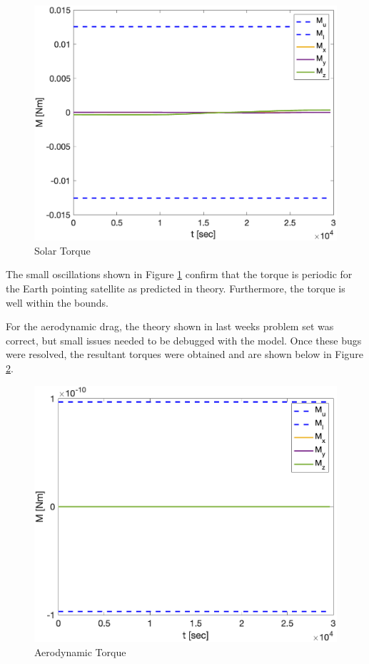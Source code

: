 \begin{figure}[H]
    \centering
    \captionsetup{ justification = centering }
    \includegraphics[width = 12cm]{Images/PS6/solar_torque.png}
    \caption{Solar Torque}
    \label{fig:solar_torque}
\end{figure}

The small oscillations shown in Figure \ref{fig:solar_torque} confirm that the torque is periodic for the Earth pointing satellite as predicted in theory. Furthermore, the torque is well within the bounds. 

For the aerodynamic drag, the theory shown in last weeks problem set was correct, but small issues needed to be debugged with the model. Once these bugs were resolved, the resultant torques were obtained and are shown below in Figure \ref{fig:aero_torque}.

\begin{figure}[H]
    \centering
    \captionsetup{ justification = centering }
    \includegraphics[width = 12cm]{Images/PS6/aero_torque.png}
    \caption{Aerodynamic Torque}
    \label{fig:aero_torque}
\end{figure}


